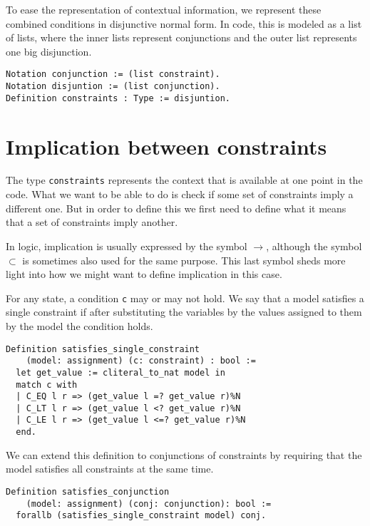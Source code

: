 To ease the representation of contextual information, we represent these combined conditions in 
disjunctive normal form. In code, this is modeled as a list of lists, where the inner lists represent 
conjunctions and the outer list represents one big disjunction.

\begin{verbatim}
Notation conjunction := (list constraint).
Notation disjuntion := (list conjunction).
Definition constraints : Type := disjuntion.
\end{verbatim}

\section{Implication between constraints}

The type \texttt{constraints} represents the context that is available at one point in the 
code. What we want to be able to do is check if some set of constraints imply a different one. But in 
order to define this we first need to define what it means that a set of constraints imply another.

In logic, implication is usually expressed by the symbol $\rightarrow$, although the symbol $\subset$ 
is sometimes also used for the same purpose. This last symbol sheds more light into how we might want 
to define implication in this case.

For any state, a condition \texttt{c} may or may not hold. We say that a model satisfies a 
single constraint if after substituting the variables by the values assigned to them by the model the 
condition holds.

\begin{verbatim}
Definition satisfies_single_constraint 
    (model: assignment) (c: constraint) : bool :=
  let get_value := cliteral_to_nat model in 
  match c with
  | C_EQ l r => (get_value l =? get_value r)%N
  | C_LT l r => (get_value l <? get_value r)%N
  | C_LE l r => (get_value l <=? get_value r)%N
  end.
\end{verbatim}

We can extend this definition to conjunctions of constraints by requiring that the model satisfies all 
constraints at the same time.

\begin{verbatim}
Definition satisfies_conjunction 
    (model: assignment) (conj: conjunction): bool :=
  forallb (satisfies_single_constraint model) conj.
\end{verbatim}

